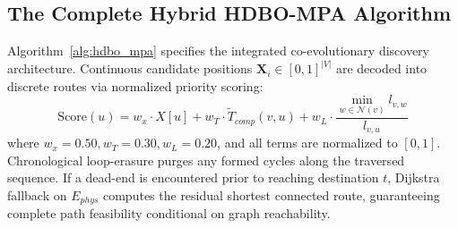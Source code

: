 \documentclass[journal,compsoc]{IEEEtran}
\begin{document}
\subsection{The Complete Hybrid HDBO-MPA Algorithm}
Algorithm~\ref{alg:hdbo_mpa} specifies the integrated co-evolutionary discovery architecture. Continuous candidate positions $\mathbf{X}_i \in [0, 1]^{|V|}$ are decoded into discrete routes via normalized priority scoring:
\begin{equation}
\text{Score}(u) = w_x \cdot X[u] + w_T \cdot \widetilde{T}_{comp}(v, u) + w_L \cdot \frac{\min_{w \in \mathcal{N}(v)} l_{v, w}}{l_{v, u}}
\end{equation}
where $w_x = 0.50, w_T = 0.30, w_L = 0.20$, and all terms are normalized to $[0, 1]$. Chronological loop-erasure purges any formed cycles along the traversed sequence. If a dead-end is encountered prior to reaching destination $t$, Dijkstra fallback on $E_{phys}$ computes the residual shortest connected route, guaranteeing complete path feasibility conditional on graph reachability.
\end{document}
